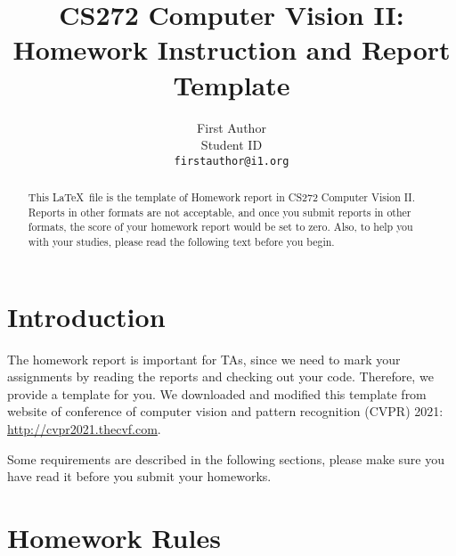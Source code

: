 \documentclass[10pt,twocolumn,letterpaper]{article}
\begin{document}
\title{CS272 Computer Vision II: \\ Homework Instruction and Report Template}

\author{First Author\\
Student ID\\
{\tt\small firstauthor@i1.org}
}

\maketitle

\begin{abstract}
This \LaTeX\ file is the template of Homework report in CS272 Computer Vision II. Reports in other formats are not acceptable, and once you submit reports in other formats, the score of your homework report would be set to zero. Also, to help you with your studies, please read the following text before you begin.
\end{abstract}

\section{Introduction}
The homework report is important for TAs, since we need to mark your assignments by reading the reports and checking out your code. Therefore, we provide a template for you. We downloaded and modified this template from website of conference of computer vision and pattern recognition (CVPR) 2021: \url{http://cvpr2021.thecvf.com}.

Some requirements are described in the following sections, please make sure you have read it before you submit your homeworks.

\section{Homework Rules}
\end{document}
